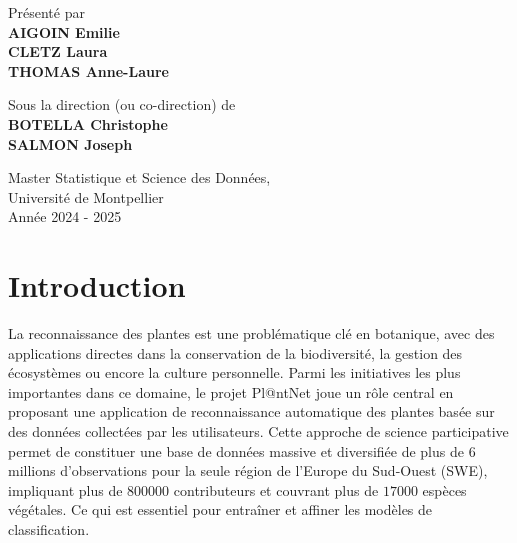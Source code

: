 \documentclass[a4paper,12pt]{article}
\begin{document}
\vfill
\begin{center}
Présenté par \\ \vspace{0.2cm}
    {\textbf{AIGOIN Emilie \\ \vspace{0.1cm} CLETZ Laura \\ \vspace{0.1cm} THOMAS Anne-Laure}}\\ \vspace{0.6cm}
    
Sous la direction (ou co-direction) de \\ \vspace{0.2cm}
    {\textbf{BOTELLA Christophe \\ \vspace{0.1cm} SALMON Joseph }}\\ \vspace{1.5cm}
    
    {\large Master Statistique et Science des Données, \\ \vspace{0.1cm} Université de Montpellier}\\ \vspace{0.6cm}
    {\large Année 2024 - 2025}
\end{center}

\thispagestyle{empty}

\newpage

\tableofcontents 

\newpage


\section{Introduction}

La reconnaissance des plantes est une problématique clé en botanique, avec des applications directes dans la conservation de la biodiversité, la gestion des écosystèmes ou encore la culture personnelle. Parmi les initiatives les plus importantes dans ce domaine, le projet Pl@ntNet joue un rôle central en proposant une application de reconnaissance automatique des plantes basée sur des données collectées par les utilisateurs. Cette approche de science participative permet de constituer une base de données massive et diversifiée de plus de $6$ millions d'observations pour la seule région de l'Europe du Sud-Ouest (SWE), impliquant plus de $\num{800000}$ contributeurs et couvrant plus de $\num{17000}$ espèces végétales. Ce qui est essentiel pour entraîner et affiner les modèles de classification.
\end{document}
